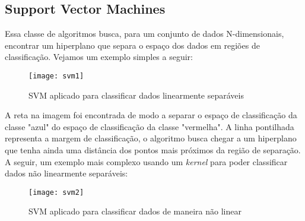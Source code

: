 \subsection{Support Vector Machines}

Essa classe de algoritmos busca, para um conjunto de dados N-dimensionais, encontrar um hiperplano que separa o espaço dos dados em regiões de classificação. Vejamos um exemplo simples a seguir:


\begin{figure}[ht]
	\centering
	\caption{SVM aplicado para classificar dados linearmente separáveis}
  \texttt{[image: svm1]}
\label{fig:svm1}  

\end{figure}



A reta na imagem foi encontrada de modo a separar o espaço de classificação da classe "azul" do espaço de classificação da classe "vermelha". A linha pontilhada representa a margem de classificação, o algoritmo busca chegar a um hiperplano que tenha ainda uma distância dos pontos mais próximos da região de separação. A seguir, um exemplo mais complexo usando um \textit{kernel}  para poder classificar dados não linearmente separáveis:

\begin{figure}[ht]
	\centering
	\caption{SVM aplicado para classificar dados de maneira não linear}
  \texttt{[image: svm2]}
\label{fig:svm2}  

\end{figure}

